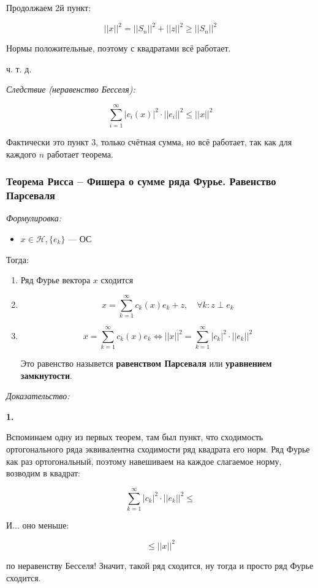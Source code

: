 \documentclass{article}
\begin{document}
Продолжаем 2й пункт:

\[||x||^2 = ||S_n||^2 + ||z||^2 \ge ||S_n||^2\]

Нормы положительные, поэтому с квадратами всё работает.

ч. т. д. 

\textit{Следствие (неравенство Бесселя): }

\[\sum_{i = 1}^{\infty} |c_i(x)|^2 \cdot ||e_i||^2 \le ||x||^2\]

Фактически это пункт 3, только счётная сумма, но всё работает, так как для каждого $n$ работает теорема.

\subsubsection{Теорема Рисса -- Фишера о сумме ряда Фурье. Равенство Парсеваля}
\textit{Формулировка:}

\begin{itemize}
    \item $x \in \mathcal{H}, \{e_k\}$ --- ОС
\end{itemize}

Тогда:

\begin{enumerate}
    \item Ряд Фурье вектора $x$ сходится
    \item \[x = \sum_{k = 1}^{\infty} c_k(x)e_k + z, \quad \forall k: z \perp e_k\]
    \item \[x = \sum_{k = 1}^{\infty} c_k(x)e_k \Leftrightarrow ||x||^2 = \sum_{k = 1}^{\infty} |c_k|^2 \cdot ||e_k||^2\]
    
    Это равенство назывется \textbf{равенством Парсеваля} или \textbf{уравнением замкнутости}.
\end{enumerate}

\textit{Доказательство:}

\textbf{1.}

Вспоминаем одну из первых теорем, там был пункт, что сходимость ортогонального ряда эквивалентна сходимости ряд квадрата его норм. Ряд Фурье как раз ортогональный, поэтому навешиваем на каждое слагаемое норму, возводим в квадрат:

\[\sum_{k = 1}^{\infty} |c_k|^2 \cdot ||e_k||^2 \le\]

И... оно меньше:

\[\le ||x||^2\] 

по неравенству Бесселя! Значит, такой ряд сходится, ну тогда и просто ряд Фурье сходится.
\end{document}
